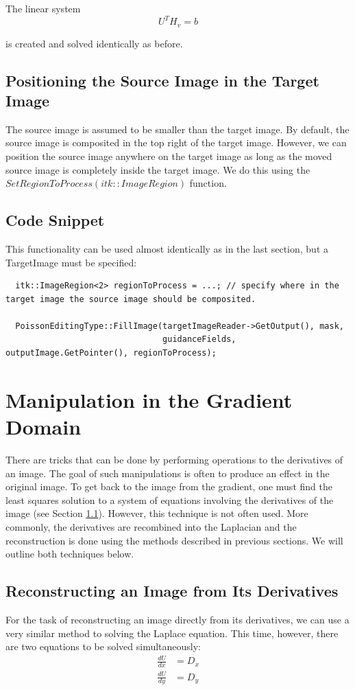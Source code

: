 \documentclass{InsightArticle}
\begin{document}
The linear system 
\begin{equation}
 U^T H_v = b
\end{equation}

is created and solved identically as before.

\subsection{Positioning the Source Image in the Target Image}
The source image is assumed to be smaller than the target image. By default, the source image is composited in the top right of the target image. However, we can position the source image anywhere on the target image as long as the moved source image is completely inside the target image. We do this using the $SetRegionToProcess(itk::ImageRegion)$ function.

\subsection{Code Snippet}
This functionality can be used almost identically as in the last section, but a TargetImage must be specified:

\begin{verbatim}
  itk::ImageRegion<2> regionToProcess = ...; // specify where in the target image the source image should be composited.
  
  PoissonEditingType::FillImage(targetImageReader->GetOutput(), mask,
                                guidanceFields, outputImage.GetPointer(), regionToProcess);
\end{verbatim}

\section{Manipulation in the Gradient Domain}
There are tricks that can be done by performing operations to the derivatives of an image. The goal of such manipulations is often to produce an effect in the original image. To get back to the image from the gradient, one must find the least squares solution to a system of equations involving the derivatives of the image (see Section \ref{sec:ReconstructingFromDerivatives}). However, this technique is not often used. More commonly, the derivatives are recombined into the Laplacian and the reconstruction is done using the methods described in previous sections. We will outline both techniques below.

\subsection{Reconstructing an Image from Its Derivatives}
\label{sec:ReconstructingFromDerivatives}
For the task of reconstructing an image directly from its derivatives, we can use a very similar method to solving the Laplace equation. This time, however, there are two equations to be solved simultaneously:
\begin{align}
\frac{dU}{dx} &= D_x \\
\frac{dU}{dy} &= D_y
\end{align}
\end{document}
